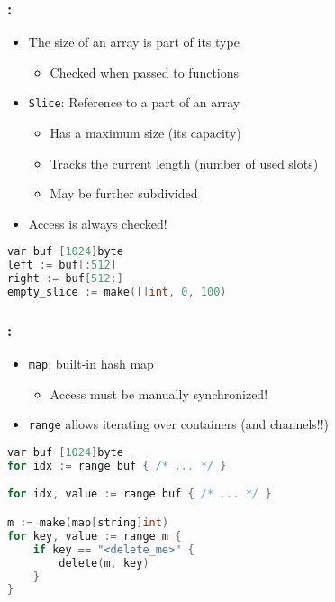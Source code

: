 \begin{frame}[fragile]
    \frametitle{\secname: \small\subsecname\normalsize}

    \begin{itemize}
        \item The size of an array is part of its type
        \begin{itemize}
            \item Checked when passed to functions
        \end{itemize}
        \item \texttt{Slice}: Reference to a part of an array
        \begin{itemize}
            \item Has a maximum size (its capacity)
            \item Tracks the current length (number of used slots)
            \item May be further subdivided
        \end{itemize}
        \item Access is always checked!
    \end{itemize}

    \small \begin{lstlisting}[language=c]
var buf [1024]byte
left := buf[:512]
right := buf[512:]
empty_slice := make([]int, 0, 100)
    \end{lstlisting} \normalsize
\end{frame}

\begin{frame}[fragile]
    \frametitle{\secname: \small\subsecname\normalsize}

    \begin{itemize}
        \item \texttt{map}: built-in hash map
        \begin{itemize}
            \item Access must be manually synchronized!
        \end{itemize}
        \item \texttt{range} allows iterating over containers (and channels!!)
    \end{itemize}

    \small \begin{lstlisting}[language=c]
var buf [1024]byte
for idx := range buf { /* ... */ }

for idx, value := range buf { /* ... */ }

m := make(map[string]int)
for key, value := range m {
    if key == "<delete_me>" {
        delete(m, key)
    }
}
    \end{lstlisting} \normalsize
\end{frame}

